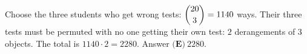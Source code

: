 Choose the three students who get wrong tests: $\dbinom{20}3=1140$ ways. Their three tests must be permuted with no one getting their own test: $2$ derangements of $3$ objects. The total is $1140\cdot2=2280$. Answer $\boxed{\textbf{(E)}\ 2280}$.
